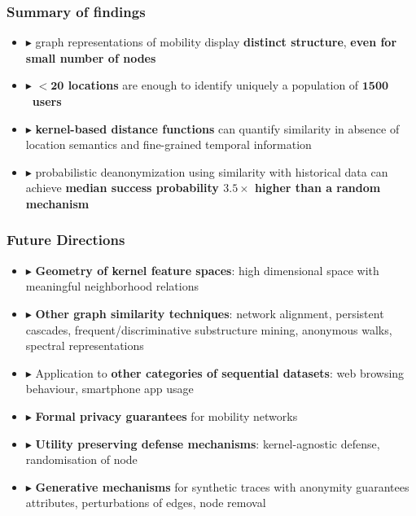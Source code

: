 \documentclass[hyperref={colorlinks = true},unknownkeysallowed]{beamer}
\begin{document}
\begin{frame}
	\frametitle{Summary of findings}
	\begin{block}{}%
				\begin{itemize}
				\item $\blacktriangleright$ graph representations of mobility display \textbf{distinct structure},
				\textbf{even for small number of nodes}
				\item  $\blacktriangleright$ \textbf{$ \mathbf{< 20}$ locations} are enough to identify uniquely a
				population of \mbox{\textbf{$ \mathbf{1500} $ users}}
				\item  $\blacktriangleright$ \textbf{kernel-based distance functions} can quantify similarity in absence
				of location semantics and fine-grained temporal information
				\item  $\blacktriangleright$ probabilistic deanonymization using similarity with historical
				data can achieve \textbf{median success probability $ \mathbf{3.5\times} $ higher
					than a random mechanism}
			\end{itemize}
			
	\end{block}
\end{frame}



\begin{frame}
	\frametitle{Future Directions}
	\begin{itemize}
		\item  $\blacktriangleright$ \textbf{Geometry of kernel feature spaces}: high dimensional space with meaningful neighborhood relations 
		\item  $\blacktriangleright$ \textbf{Other graph similarity techniques}: network alignment,
		persistent cascades, frequent/discriminative substructure mining, anonymous walks, spectral representations
		\item  $\blacktriangleright$ Application to \textbf{other categories of sequential datasets}: web browsing
		behaviour, smartphone app usage
		\item  $\blacktriangleright$ \textbf{Formal privacy guarantees} for mobility networks
		\item  $\blacktriangleright$ \textbf{Utility preserving defense mechanisms}: kernel-agnostic defense, randomisation of node
		\item  $\blacktriangleright$ \textbf{Generative mechanisms} for synthetic traces with anonymity guarantees
		attributes, perturbations of edges, node removal
	\end{itemize}
\end{frame}
\end{document}
